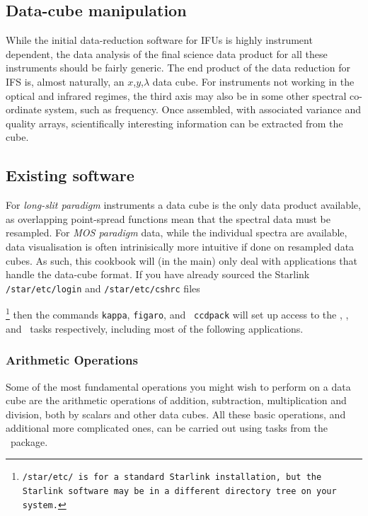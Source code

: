 \documentclass[twoside,11pt]{article}
\newcommand{\xlabel}[1]{}
\begin{document}
\begin{\htmlonly}
\newpage
\section{\xlabel{sc16_datacube}Data-cube manipulation\label{sc16_datacube}}

While the initial data-reduction software for IFUs is highly
instrument dependent, the data analysis of the final science data
product for all these instruments should be fairly generic.  The end
product of the data reduction for IFS is, almost naturally, an
$x$,$y$,$\lambda$ data cube.  For instruments not working in the
optical and infrared regimes, the third axis may also be in some other
spectral co-ordinate system, such as frequency.  Once assembled, with
associated variance and quality arrays, scientifically interesting
information can be extracted from the cube.

\subsection{\xlabel{sc16_exist}Existing software\label{sc16_exist}}

For {\em long-slit paradigm} instruments a data cube is the only data
product available, as overlapping point-spread functions mean that the
spectral data must be resampled.  For {\em MOS paradigm} data, while
the individual spectra are available, data visualisation is often
intrinisically more intuitive if done on resampled data cubes.  As
such, this cookbook will (in the main) only deal with applications
that handle the data-cube format.  If you have already sourced the
Starlink {\tt /star/etc/login} and {\tt /star/etc/cshrc} 
files{\footnote {\tt /star/etc/ is for a standard Starlink installation,
but the Starlink software may be in a different directory tree on your
system.} then the commands {\tt kappa}, {\tt figaro}, and {\tt
ccdpack} will set up access to the \KAPPAref, \FIGAROref, and
\CCDPACKref\ tasks respectively, including most of the following
applications.

\subsubsection{Arithmetic Operations}

Some of the most fundamental operations you might wish to perform on a
data cube are the arithmetic operations of addition, subtraction,
multiplication and division, both by scalars and other data cubes.  All
these basic operations, and additional more complicated ones, can be
carried out using tasks from the \KAPPAref\ package.

}
\end{\htmlonly}
\end{document}
